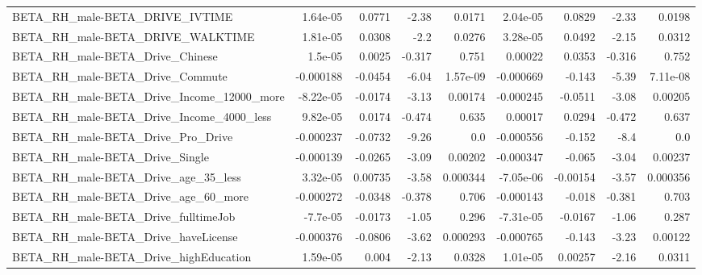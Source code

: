 \begin{tabular}{lrrrrrrrr}
BETA\_RH\_male-BETA\_DRIVE\_IVTIME                     &    1.64e-05 &       0.0771 &     -2.38 &   0.0171 &   2.04e-05 &      0.0829 &        -2.33 &        0.0198 \\
BETA\_RH\_male-BETA\_DRIVE\_WALKTIME                   &    1.81e-05 &       0.0308 &      -2.2 &   0.0276 &   3.28e-05 &      0.0492 &        -2.15 &        0.0312 \\
BETA\_RH\_male-BETA\_Drive\_Chinese                    &     1.5e-05 &       0.0025 &    -0.317 &    0.751 &    0.00022 &      0.0353 &       -0.316 &         0.752 \\
BETA\_RH\_male-BETA\_Drive\_Commute                    &   -0.000188 &      -0.0454 &     -6.04 & 1.57e-09 &  -0.000669 &      -0.143 &        -5.39 &      7.11e-08 \\
BETA\_RH\_male-BETA\_Drive\_Income\_12000\_more          &   -8.22e-05 &      -0.0174 &     -3.13 &  0.00174 &  -0.000245 &     -0.0511 &        -3.08 &       0.00205 \\
BETA\_RH\_male-BETA\_Drive\_Income\_4000\_less           &    9.82e-05 &       0.0174 &    -0.474 &    0.635 &    0.00017 &      0.0294 &       -0.472 &         0.637 \\
BETA\_RH\_male-BETA\_Drive\_Pro\_Drive                  &   -0.000237 &      -0.0732 &     -9.26 &      0.0 &  -0.000556 &      -0.152 &         -8.4 &           0.0 \\
BETA\_RH\_male-BETA\_Drive\_Single                     &   -0.000139 &      -0.0265 &     -3.09 &  0.00202 &  -0.000347 &      -0.065 &        -3.04 &       0.00237 \\
BETA\_RH\_male-BETA\_Drive\_age\_35\_less                &    3.32e-05 &      0.00735 &     -3.58 & 0.000344 &  -7.05e-06 &    -0.00154 &        -3.57 &      0.000356 \\
BETA\_RH\_male-BETA\_Drive\_age\_60\_more                &   -0.000272 &      -0.0348 &    -0.378 &    0.706 &  -0.000143 &      -0.018 &       -0.381 &         0.703 \\
BETA\_RH\_male-BETA\_Drive\_fulltimeJob                &    -7.7e-05 &      -0.0173 &     -1.05 &    0.296 &  -7.31e-05 &     -0.0167 &        -1.06 &         0.287 \\
BETA\_RH\_male-BETA\_Drive\_haveLicense                &   -0.000376 &      -0.0806 &     -3.62 & 0.000293 &  -0.000765 &      -0.143 &        -3.23 &       0.00122 \\
BETA\_RH\_male-BETA\_Drive\_highEducation              &    1.59e-05 &        0.004 &     -2.13 &   0.0328 &   1.01e-05 &     0.00257 &        -2.16 &        0.0311 \\

\end{tabular}
